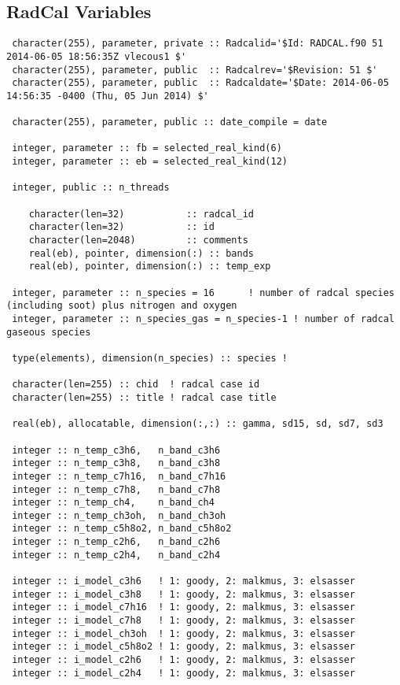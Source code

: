 \subsection{RadCal Variables}
 \begin{lstlisting}
 character(255), parameter, private :: Radcalid='$Id: RADCAL.f90 51 2014-06-05 18:56:35Z vlecous1 $'
 character(255), parameter, public  :: Radcalrev='$Revision: 51 $'
 character(255), parameter, public  :: Radcaldate='$Date: 2014-06-05 14:56:35 -0400 (Thu, 05 Jun 2014) $'

 character(255), parameter, public :: date_compile = date

 integer, parameter :: fb = selected_real_kind(6)
 integer, parameter :: eb = selected_real_kind(12)

 integer, public :: n_threads

    character(len=32)           :: radcal_id
    character(len=32)           :: id
    character(len=2048)         :: comments
    real(eb), pointer, dimension(:) :: bands
    real(eb), pointer, dimension(:) :: temp_exp

 integer, parameter :: n_species = 16      ! number of radcal species (including soot) plus nitrogen and oxygen
 integer, parameter :: n_species_gas = n_species-1 ! number of radcal gaseous species

 type(elements), dimension(n_species) :: species !

 character(len=255) :: chid  ! radcal case id
 character(len=255) :: title ! radcal case title

 real(eb), allocatable, dimension(:,:) :: gamma, sd15, sd, sd7, sd3

 integer :: n_temp_c3h6,   n_band_c3h6
 integer :: n_temp_c3h8,   n_band_c3h8
 integer :: n_temp_c7h16,  n_band_c7h16
 integer :: n_temp_c7h8,   n_band_c7h8
 integer :: n_temp_ch4,    n_band_ch4
 integer :: n_temp_ch3oh,  n_band_ch3oh
 integer :: n_temp_c5h8o2, n_band_c5h8o2
 integer :: n_temp_c2h6,   n_band_c2h6
 integer :: n_temp_c2h4,   n_band_c2h4

 integer :: i_model_c3h6   ! 1: goody, 2: malkmus, 3: elsasser
 integer :: i_model_c3h8   ! 1: goody, 2: malkmus, 3: elsasser
 integer :: i_model_c7h16  ! 1: goody, 2: malkmus, 3: elsasser
 integer :: i_model_c7h8   ! 1: goody, 2: malkmus, 3: elsasser
 integer :: i_model_ch3oh  ! 1: goody, 2: malkmus, 3: elsasser
 integer :: i_model_c5h8o2 ! 1: goody, 2: malkmus, 3: elsasser
 integer :: i_model_c2h6   ! 1: goody, 2: malkmus, 3: elsasser
 integer :: i_model_c2h4   ! 1: goody, 2: malkmus, 3: elsasser


\end{lstlisting}
